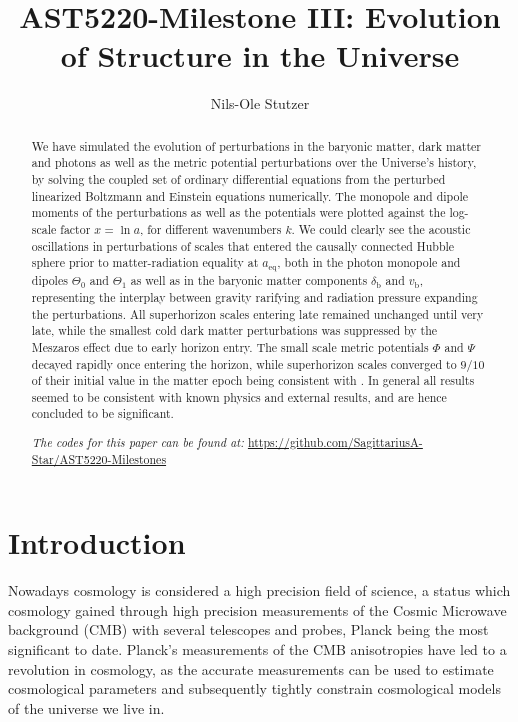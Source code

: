 \documentclass[twocolumn]{aastex62}
\begin{document}
\title{\Large AST5220-Milestone III: Evolution of Structure in the Universe}

\author{Nils-Ole Stutzer}

\begin{abstract}
    We have simulated the evolution of perturbations in the baryonic matter, dark matter and photons as well as the metric potential perturbations over the Universe's history, by solving the coupled set of ordinary differential equations from the perturbed linearized Boltzmann and Einstein equations numerically. The monopole and dipole moments of the perturbations as well as the potentials were plotted against the log-scale factor $x = \ln a$, for different wavenumbers $k$. We could clearly see the acoustic oscillations in perturbations of scales that entered the causally connected Hubble sphere prior to matter-radiation equality at $a_\text{eq}$, both in the photon monopole and dipoles $\Theta_0$ and $\Theta_1$ as well as in the baryonic matter components $\delta_\text{b}$ and $v_\text{b}$, representing the interplay between gravity rarifying and radiation pressure expanding the perturbations. All superhorizon scales entering late remained unchanged until very late, while the smallest cold dark matter perturbations was suppressed by the Meszaros effect due to early horizon entry. The small scale metric potentials $\Phi$ and $\Psi$ decayed rapidly once entering the horizon, while superhorizon scales converged to $9/10$ of their initial value in the matter epoch being consistent with \cite{dodelson:2003}. In general all results seemed to be consistent with known physics and external results, and are hence concluded to be significant.


    \textit{The codes for this paper can be found at:} \newline \url{https://github.com/SagittariusA-Star/AST5220-Milestones}
\end{abstract}

\section{Introduction} \label{sec:Intro}
Nowadays cosmology is considered a high precision field of science, a status which cosmology gained through high precision measurements of the Cosmic Microwave background (CMB) with several telescopes and probes, Planck \citep[]{planckcollaboration:2018} being the most significant to date. Planck's measurements of the CMB anisotropies have led to a revolution in cosmology, as the accurate measurements can be used to estimate cosmological parameters and subsequently tightly constrain cosmological models of the universe we live in.
\end{document}
